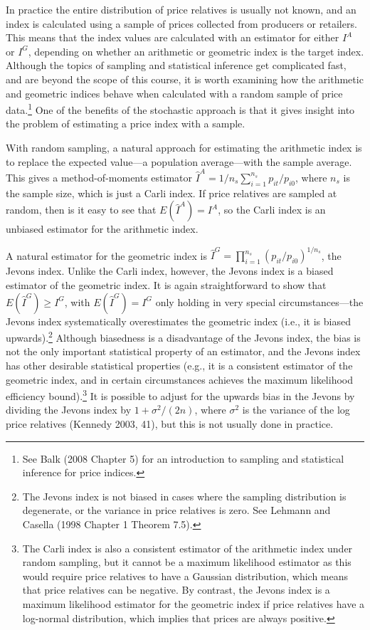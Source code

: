 \documentclass[]{article}
\begin{document}
In practice the entire distribution of price relatives is usually not known, and an index is calculated using a sample of prices collected from producers or retailers. This means that the index values are calculated with an estimator for either \(I^{A}\) or \(I^{G}\), depending on whether an arithmetic or geometric index is the target index. Although the topics of sampling and statistical inference get complicated fast, and are beyond the scope of this course, it is worth examining how the arithmetic and geometric indices behave when calculated with a random sample of price data.\footnote{See Balk (2008 Chapter 5) for an introduction to sampling and statistical inference for price indices.} One of the benefits of the stochastic approach is that it gives insight into the problem of estimating a price index with a sample.

With random sampling, a natural approach for estimating the arithmetic index is to replace the expected value---a population average---with the sample average. This gives a method-of-moments estimator \(\hat{I}^A = 1 / n_{s} \sum_{i = 1}^{n_{s}} p_{it} / p_{i0}\), where \(n_{s}\) is the sample size, which is just a Carli index. If price relatives are sampled at random, then is it easy to see that \(E(\hat{I}^{A}) = I^{A}\), so the Carli index is an unbiased estimator for the arithmetic index.

A natural estimator for the geometric index is \(\hat{I}^{G} = \prod_{i = 1}^{n_{s}} (p_{it} / p_{i0})^{1 / n_{s}}\), the Jevons index. Unlike the Carli index, however, the Jevons index is a biased estimator of the geometric index. It is again straightforward to show that \(E(\hat{I}^{G}) \geq I^{G}\), with \(E(\hat{I}^{G}) = I^{G}\) only holding in very special circumstances---the Jevons index systematically overestimates the geometric index (i.e., it is biased upwards).\footnote{The Jevons index is not biased in cases where the sampling distribution is degenerate, or the variance in price relatives is zero. See Lehmann and Casella (1998 Chapter 1 Theorem 7.5).} Although biasedness is a disadvantage of the Jevons index, the bias is not the only important statistical property of an estimator, and the Jevons index has other desirable statistical properties (e.g., it is a consistent estimator of the geometric index, and in certain circumstances achieves the maximum likelihood efficiency bound).\footnote{The Carli index is also a consistent estimator of the arithmetic index under random sampling, but it cannot be a maximum likelihood estimator as this would require price relatives to have a Gaussian distribution, which means that price relatives can be negative. By contrast, the Jevons index is a maximum likelihood estimator for the geometric index if price relatives have a log-normal distribution, which implies that prices are always positive.} It is possible to adjust for the upwards bias in the Jevons by dividing the Jevons index by \(1 + \sigma^{2}/(2n)\), where \(\sigma^{2}\) is the variance of the log price relatives (Kennedy 2003, 41), but this is not usually done in practice.
\end{document}
